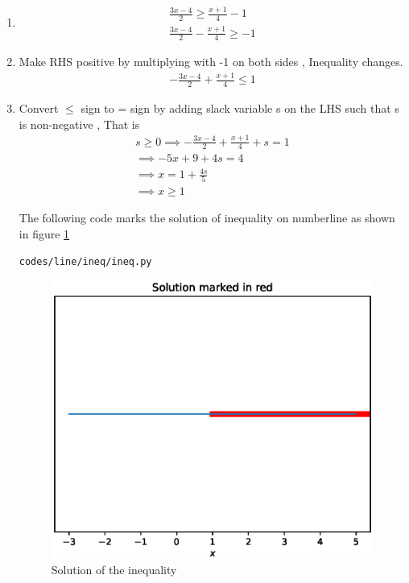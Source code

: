 \renewcommand{\theequation}{\theenumi}
\begin{enumerate}[label=\thesection.\arabic*.,ref=\thesection.\theenumi]

\item 
\begin{align}
\frac{3x-4}{2} \geq \frac{x+1}{4} - 1
\\
\frac{3x-4}{2}-\frac{x+1}{4} \geq -1
\end{align}
\item Make RHS positive by multiplying with -1 on both sides , Inequality changes.
\begin{align}
-\frac{3x-4}{2}+\frac{x+1}{4} \leq 1
\end{align}
\item Convert $\leq$ sign to = sign by adding slack variable s on the LHS such that s is non-negative , That is
\begin{align}
s \geq 0
\implies -\frac{3x-4}{2}+\frac{x+1}{4} + s = 1
\\
\implies -5x+9+4s=4
\\
\implies x=1+\frac{4s}{5}
\\
\implies x \geq 1
\end{align}

The following code marks the solution of inequality on numberline as shown in figure \ref{fig:ineq_py}
\begin{lstlisting}
codes/line/ineq/ineq.py
\end{lstlisting}
\begin{figure}[!ht]
\centering
\includegraphics[width=\columnwidth]{./codes/line/ineq/pyfigs/ineq.eps}
\caption{Solution of the inequality}
\label{fig:ineq_py}
\end{figure}

\end{enumerate}
